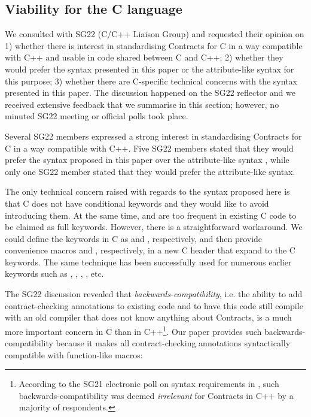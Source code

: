 
\subsection{Viability for the C language}
\label{subsec:clang}

We consulted with SG22 (C/C++ Liaison Group) and requested their opinion on 1) whether there is interest in standardising Contracts for C in a way compatible with C++ and usable in code shared between C and C++; 2) whether they would prefer the syntax presented in this paper or the attribute-like syntax \cite{P2935R3} for this purpose; 3) whether there are C-specific technical concerns with the syntax presented in this paper. The discussion happened on the SG22 reflector and we received extensive feedback that we summarise in this section; however, no minuted SG22 meeting or official polls took place.

Several SG22 members expressed a strong interest in standardising Contracts for C in a way compatible with C++. Five SG22 members stated that they would prefer the syntax proposed in this paper over the attribute-like syntax \cite{P2935R3}, while only one SG22 member stated that they would prefer the attribute-like syntax.

The only technical concern raised with regards to the syntax proposed here is that C does not have conditional keywords and they would like to avoid introducing them. At the same time,  and  are too frequent in existing C code to be claimed as full keywords. However, there is a straightforward workaround. We could define the keywords in C as  and , respectively, and then provide convenience macros  and , respectively, in a new C header  that expand to the C keywords. The same technique has been successfully used for numerous earlier keywords such as , , , , etc.

The SG22 discussion revealed that \emph{backwards-compatibility}, i.e. the ability to add contract-checking annotations to existing code and to have this code still compile with an old compiler that does not know anything about Contracts, is a much more important concern in C than in C++\footnote{According to the SG21 electronic poll on syntax requirements in \cite{P2885R3}, such backwards-compatibility was deemed \emph{irrelevant} for Contracts in C++ by a majority of respondents.}. Our paper provides such backwards-compatibility because it makes all contract-checking annotations syntactically compatible with function-like macros:

